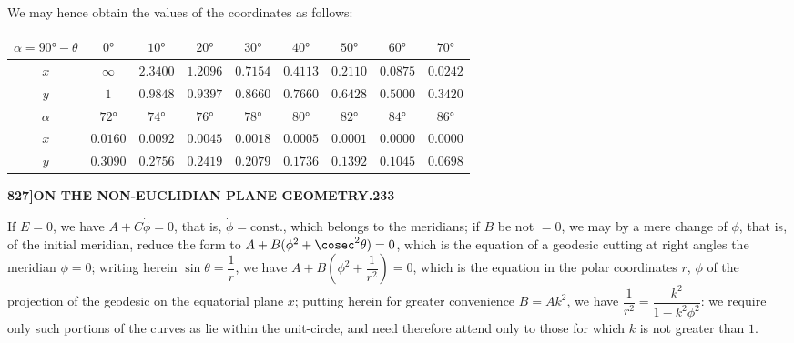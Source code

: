 \documentclass[11pt,a4paper]{book}
\begin{document}
We may hence obtain the values of the coordinates as follows:

\begin{center}
\begin{tabular}{c|c|c|c|c|c|c|c|c}
$\alpha = 90° - \theta$ & $0°$ & $10°$ & $20°$ & $30°$ & $40°$ & $50°$ & $60°$ & $70°$ \\
\hline
$x$ & $\infty$ & $2.3400$ & $1.2096$ & $0.7154$ & $0.4113$ & $0.2110$ & $0.0875$ & $0.0242$ \\
\hline
$y$ & $1$ & $0.9848$ & $0.9397$ & $0.8660$ & $0.7660$ & $0.6428$ & $0.5000$ & $0.3420$ \\
\hline
$\alpha$ & $72°$ & $74°$ & $76°$ & $78°$ & $80°$ & $82°$ & $84°$ & $86°$ \\
\hline
$x$ & $0.0160$ & $0.0092$ & $0.0045$ & $0.0018$ & $0.0005$ & $0.0001$ & $0.0000$ & $0.0000$ \\
\hline
$y$ & $0.3090$ & $0.2756$ & $0.2419$ & $0.2079$ & $0.1736$ & $0.1392$ & $0.1045$ & $0.0698$
\end{tabular}
\end{center}

\newpage
\setcounter{page}{233}

\noindent\textbf{827]}\hfill\textbf{ON THE NON-EUCLIDIAN PLANE GEOMETRY.}\hfill\textbf{233}

\bigskip

\noindent If $E = 0$, we have $A + C\dot{\phi} = 0$, that is, $\dot{\phi} = \text{const.}$, which belongs to the meridians; if $B$ be not $= 0$, we may by a mere change of $\phi$, that is, of the initial meridian, reduce the form to $A + B(\phi^2 + \cosec^2\theta) = 0$, which is the equation of a geodesic cutting at right angles the meridian $\phi = 0$; writing herein $\sin\theta = \dfrac{1}{r}$, we have $A + B(\phi^2 + \dfrac{1}{r^2}) = 0$, which is the equation in the polar coordinates $r$, $\phi$ of the projection of the geodesic on the equatorial plane $x$; putting herein for greater convenience $B = Ak^2$, we have $\dfrac{1}{r^2} = \dfrac{k^2}{1 - k^2\phi^2}$: we require only such portions of the curves as lie within the unit-circle, and need therefore attend only to those for which $k$ is not greater than $1$.
\end{document}
